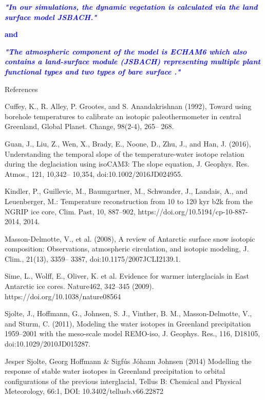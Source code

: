 \documentclass[gmd, manuscript]{copernicus}
\begin{document}
\medskip

\textcolor{blue}{\textbf{\textit{"In our simulations, the dynamic vegetation is calculated via the land surface model JSBACH."}}}

\medskip

\textcolor{blue}{\textbf{and}}

\medskip

\textcolor{blue}{\textbf{\textit{"The atmospheric component of the model is ECHAM6 \citep{stevens2013atmospheric} which also contains  a land-surface module (JSBACH)  representing multiple plant functional types and two types of bare surface \citep{loveland2000development,raddatz2007will}."}}}
 
\medskip

References

Cuffey, K., R. Alley, P. Grootes, and S. Anandakrishnan (1992), Toward using borehole temperatures to calibrate an isotopic paleothermometer in central Greenland, Global Planet. Change,  98(2-4),  265– 268.

Guan, J.,  Liu, Z.,  Wen, X.,  Brady, E.,  Noone, D.,  Zhu, J., and  Han, J. (2016),  Understanding the temporal slope of the temperature-water isotope relation during the deglaciation using isoCAM3: The slope equation, J. Geophys. Res. Atmos.,  121,  10,342– 10,354, doi:10.1002/2016JD024955.

Kindler, P., Guillevic, M., Baumgartner, M., Schwander, J., Landais, A., and Leuenberger, M.: Temperature reconstruction from 10 to 120 kyr b2k from the NGRIP ice core, Clim. Past, 10, 887–902, https://doi.org/10.5194/cp-10-887-2014, 2014.

Masson-Delmotte, V., et al. (2008), A review of Antarctic surface snow isotopic composition: Observations, atmospheric circulation, and isotopic modeling, J. Clim.,  21(13),  3359– 3387, doi:10.1175/2007JCLI2139.1.

Sime, L., Wolff, E., Oliver, K. et al. Evidence for warmer interglacials in East Antarctic ice cores. Nature462, 342–345 (2009). https://doi.org/10.1038/nature08564

Sjolte, J.,  Hoffmann, G.,  Johnsen, S. J.,  Vinther, B. M.,  Masson-Delmotte, V., and  Sturm, C. (2011), Modeling the water isotopes in Greenland precipitation 1959–2001 with the meso-scale model REMO-iso, J. Geophys. Res.,  116, D18105, doi:10.1029/2010JD015287.

Jesper Sjolte, Georg Hoffmann & Sigfús Jóhann Johnsen (2014) Modelling the response of stable water isotopes in Greenland precipitation to orbital configurations of the previous interglacial, Tellus B: Chemical and Physical Meteorology, 66:1, DOI: 10.3402/tellusb.v66.22872
\end{document}
